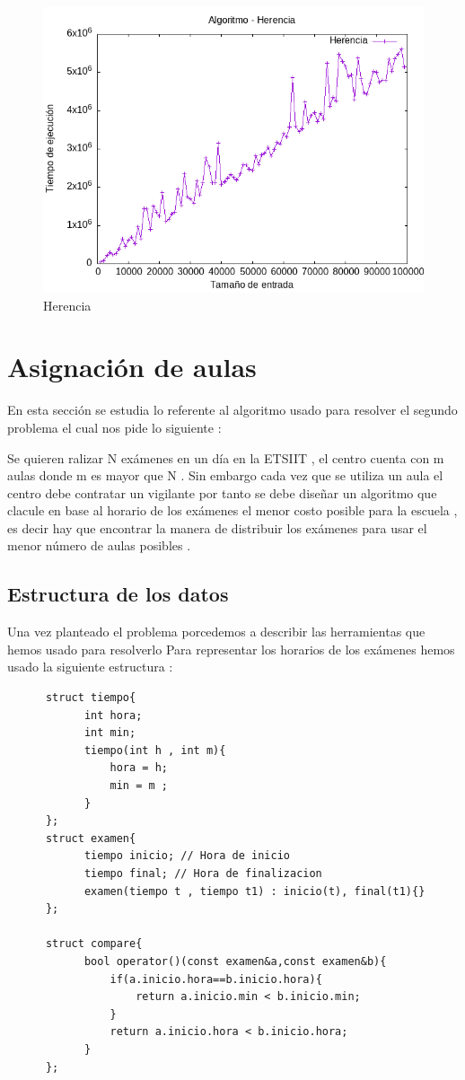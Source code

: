 \documentclass[11pt,openany]{book}
\begin{document}
\begin{figure}[H]
      \centering
      \includegraphics[width=0.6\linewidth]{assets/Img/Herencia.png}
      \caption{Herencia}
      \label{fig:Herencia}
\end{figure}

\chapter{Asignación de aulas}
En esta sección se estudia lo referente al algoritmo usado para resolver el segundo 
problema el cual nos pide lo siguiente :

Se quieren ralizar N exámenes en un día en la ETSIIT , el centro cuenta con m aulas donde m es mayor
que N . Sin embargo cada vez que se utiliza un aula el centro debe contratar un vigilante por tanto 
se debe diseñar un algoritmo que clacule en base al horario de los exámenes el menor costo posible 
para la escuela , es decir hay que encontrar la manera de distribuir los exámenes para usar el menor número
de aulas posibles .

\section{Estructura de los datos}
Una vez planteado el problema porcedemos a describir las herramientas que hemos usado para resolverlo 
Para representar los horarios de los exámenes hemos usado la siguiente estructura :

\begin{lstlisting}
      struct tiempo{
            int hora;
            int min;
            tiempo(int h , int m){
                hora = h;
                min = m ;
            }
      };
      struct examen{
            tiempo inicio; // Hora de inicio
            tiempo final; // Hora de finalizacion
            examen(tiempo t , tiempo t1) : inicio(t), final(t1){}
      };
        
      struct compare{
            bool operator()(const examen&a,const examen&b){
                if(a.inicio.hora==b.inicio.hora){
                    return a.inicio.min < b.inicio.min;
                }
                return a.inicio.hora < b.inicio.hora;
            }
      };
        
\end{lstlisting}
\end{document}
